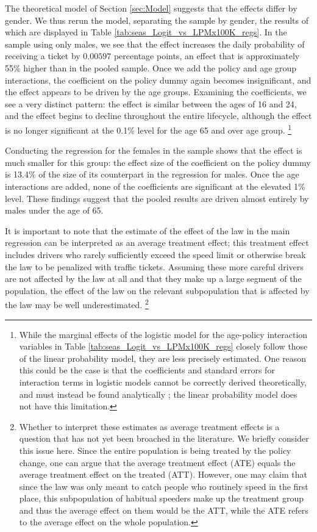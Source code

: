 The theoretical model of Section \ref{sec:Model} 
suggests that the effects differ by gender. 
We thus rerun the model, separating the sample by gender, 
the results of which are displayed in 
Table \ref{tab:seas_Logit_vs_LPMx100K_regs}.
In the sample using only males, 
we see that the effect increases the daily probability of receiving a ticket by $0.00597$ 
percentage points, an effect that is approximately 55\% higher than in the pooled sample. 
Once we add the policy and age group interactions, 
the coefficient on the policy dummy again becomes insignificant, 
and the effect appears to be driven by the age groups. 
Examining the coefficients, we see a very distinct pattern: 
the effect is similar between the ages of 16 and 24, 
and the effect begins to decline throughout the entire lifecycle, 
although the effect is no longer significant at the 0.1\% level for the age 65 and over age group.%
\footnote{%
While the marginal effects of the logistic model for the age-policy interaction variables in 
Table \ref{tab:seas_Logit_vs_LPMx100K_regs}
closely follow those of the linear probability model, they are less precisely estimated. 
One reason this could be the case is that the coefficients and standard errors 
for interaction terms in logistic models cannot be correctly derived theoretically, 
and must instead be found analytically 
\citep{ainorton2003};
the linear probability model does not have this limitation.
}
%

Conducting the regression for the females in the sample shows that 
the effect is much smaller for this group: 
the effect size of the coefficient on the policy dummy is 13.4\% of the size of its counterpart 
in the regression for males. 
Once the age interactions are added, none of the coefficients are significant at the elevated 1\% level. 
These findings suggest that the pooled results are driven almost entirely by males under the age of 65.

It is important to note that the estimate of the effect of the law in the main regression 
can be interpreted as an average treatment effect; 
this treatment effect includes drivers who rarely sufficiently exceed the speed limit 
or otherwise break the law to be penalized with traffic tickets. 
Assuming these more careful drivers are not affected by the law at all 
and that they make up a large segment of the population, 
the effect of the law on the relevant subpopulation that is affected by the law 
may be well underestimated.%
\footnote{%
Whether to interpret these estimates as average treatment effects 
is a question that has not yet been broached in the literature. 
We briefly consider this issue here. 
Since the entire population is being treated by the policy change, 
one can argue that the average treatment effect (ATE) equals 
the average treatment effect on the treated (ATT). 
However, one may claim that since the law was only meant to catch people 
who routinely speed in the first place, 
this subpopulation of habitual speeders make up the treatment group 
and thus the average effect on them would be the ATT, 
while the ATE refers to the average effect on the whole population.
}
%


